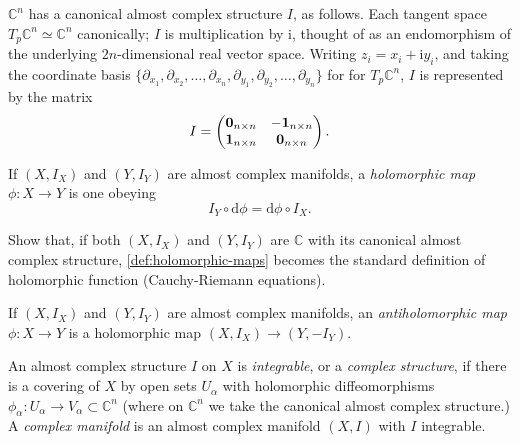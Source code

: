 \documentclass[12pt,letterpaper,reqno]{article}
\numberwithin{equation}{section}
\newcommand{\C}{\ensuremath{\mathbb C}}
\newcommand{\I}{{\mathrm i}}
\newcommand{\de}{\mathrm{d}}
\newcommand{\ti}[1]{\textit{#1}}
\begin{document}
\begin{example} $\C^n$ has a canonical almost complex structure $I$, as follows. Each tangent space $T_p \C^n \simeq \C^n$ canonically; $I$ is multiplication by $\I$, thought of as an 
endomorphism of the underlying $2n$-dimensional real vector space.
Writing $z_i = x_i + \I y_i$, and taking the coordinate basis
$\{\partial_{x_1}, \partial_{x_2}, \dots, \partial_{x_n}, \partial_{y_1}, \partial_{y_2}, \dots, \partial_{y_n}\}$ for for $T_p \C^n$, $I$ is represented by the matrix
\begin{equation}
   I = \begin{pmatrix} {\bf 0}_{n \times n} & -{\bf 1}_{n \times n} \\ {\bf 1}_{n \times n} & {\bf 0}_{n \times n} \end{pmatrix}.
\end{equation}
\end{example}

\begin{defn} \label{def:holomorphic-maps} If $(X,I_X)$ and $(Y,I_Y)$ are almost
complex manifolds, a \ti{holomorphic map} $\phi: X \to Y$
is one obeying
\begin{equation}
 I_Y \circ \de \phi = \de \phi \circ I_X.  
\end{equation}
\end{defn}

\begin{exercise} Show that, if both $(X,I_X)$ and $(Y,I_Y)$ are $\C$ with its canonical 
almost complex structure, \autoref{def:holomorphic-maps} becomes the standard
definition of holomorphic function (Cauchy-Riemann equations).
\end{exercise}

\begin{defn} \label{def:antiholomorphic-maps} If $(X,I_X)$ and $(Y,I_Y)$ are almost
complex manifolds, an \ti{antiholomorphic map} $\phi: X \to Y$
is a holomorphic map $(X,I_X) \to (Y,-I_Y)$.
\end{defn}

\begin{defn} \label{def:complex-structures} An almost complex structure $I$ on $X$ is \ti{integrable}, 
or a \ti{complex structure}, if there is a covering of $X$ by open sets $U_\alpha$ with holomorphic diffeomorphisms $\phi_\alpha: U_\alpha \to V_\alpha \subset \C^n$ (where on $\C^n$ we take the
canonical almost complex structure.) A \ti{complex manifold} is an almost complex manifold $(X,I)$ with $I$ integrable.
\end{defn}
\end{document}
